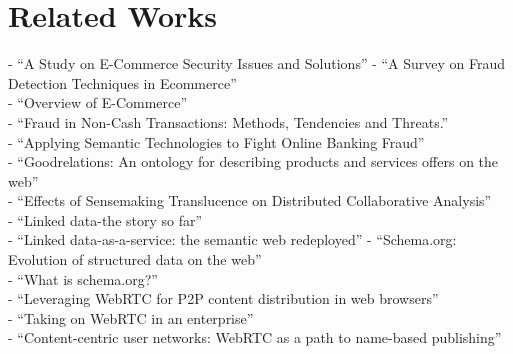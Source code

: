 
\chapter{Related Works}
\label{cha:related_works}
- ``A Study on E-Commerce Security Issues and Solutions'' \citep{sen2015study}
- ``A Survey on Fraud Detection Techniques in Ecommerce'' \citep{rana2015survey} \\
- ``Overview of E-Commerce'' \citep{ankhule2015overview} \\
- ``Fraud in Non-Cash Transactions: Methods, Tendencies and Threats.'' \citep{sobko2014fraud} \\
- ``Applying Semantic Technologies to Fight Online Banking Fraud'' \citep{carvalhoapplying} \\
- ``Goodrelations: An ontology for describing products and services offers on the web'' \citep{hepp2008goodrelations} \\
- ``Effects of Sensemaking Translucence on Distributed Collaborative Analysis'' \citep{goyaleffects} \\
- ``Linked data-the story so far'' \citep{bizer2009linked} \\
- ``Linked data-as-a-service: the semantic web redeployed'' \citep{rietveld2015linked}
- ``Schema.org: Evolution of structured data on the web'' \citep{guha2016schema} \\
- ``What is schema.org?'' \citep{barker2014schema} \\
- ``Leveraging WebRTC for P2P content distribution in web browsers'' \citep{vogt2013leveraging} \\
- ``Taking on WebRTC in an enterprise'' \citep{vogt2013leveraging} \\
- ``Content-centric user networks: WebRTC as a path to name-based publishing'' \citep{vogt2013content}

